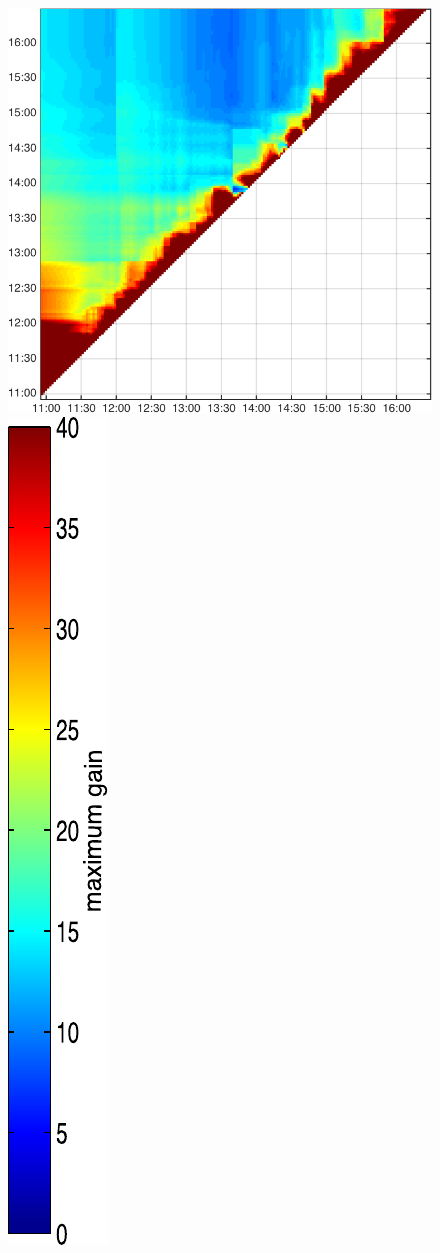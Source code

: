 \begin{figure}
\begin{minipage}[c]{\mylength}
\includegraphics[valign=t,width=\eventswidth]{events/20141114-maxGain-local-events.png}
\includegraphics[valign=t,trim=2pt -8pt 0 5pt,width=\colorbarwidth,totalheight=\eventheight]{events/colorbar-40.pdf}

\end{minipage}
\end{figure}
